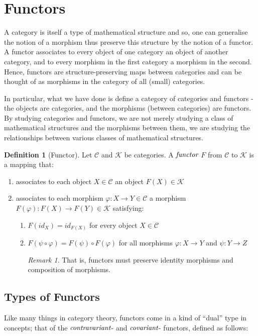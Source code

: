 \documentclass[10pt, oneside, reqno]{amsart}
\theoremstyle{plain}%
\theoremstyle{definition}
\newtheorem{defn}[thm]{Definition}
\theoremstyle{remark}
\newtheorem*{rem}{Remark}
\begin{document}
\section{Functors} %
\label{sec:functors}
A category is itself a type of mathematical structure and so, one can generalise the notion of a morphism thus preserve this structure by the notion of a
functor.
A functor associates to every object of one category an object of another category, and to every morphism in the first category a morphism in the second.
Hence, functors are structure-preserving maps between categories and can be thought of as morphisms in the category of all (small) categories.

In particular, what we have done is define a category of categories and functors - the objects are categories, and the morphisms (between categories) 
are functors.
By studying categories and functors, we are not merely studying a class of mathematical structures and the morphisms between them,
we are studying the relationships between various classes of mathematical structures.

\begin{defn}[Functor]
	Let $\mathcal{C}$ and $\mathcal{K}$ be categories. A $\emph{functor}$ $F$ from $\mathcal{C}$ to $\mathcal{K}$ is a mapping that:
	\begin{enumerate}
		\item associates to each object $X \in \mathcal{C}$ an object $F(X) \in  \mathcal{K}$
		
		\item associates to each morphism $\varphi: X \to Y \in \mathcal{C}$ a morphism $F(\varphi) : F(X) \to F(Y) \in \mathcal{K}$
		satisfying:
		\begin{enumerate}
			\item $F(id_{X}) = id_{F(X)}$ for every object $X \in \mathcal{C}$
			
			\item $F(\psi \circ \varphi) = F(\psi) \circ F(\varphi)$ for all morphisms $\varphi: X \to Y$ and $\psi: Y \to Z$
			\begin{rem}
				That is, functors must preserve identity morphisms and composition of morphisms.
			\end{rem}
		\end{enumerate}
	\end{enumerate}
\end{defn}

\subsection{Types of Functors} %
\label{subsec:functorstypes}
Like many things in category theory, functors come in a kind of ``dual'' type in concepts;
that of the $\emph{contravariant}$- and $\emph{covariant}$- functors, defined as follows:
\end{document}
